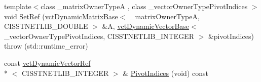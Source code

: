 \begin{DoxyCompactItemize}
{\footnotesize template$<$class \-\_\-matrix\-Owner\-Type\-A , class \-\_\-vector\-Owner\-Type\-Pivot\-Indices $>$ }\\void \hyperlink{classnmr_l_u_dynamic_data_ae456c133f5faeb23177a4a50fbb20eb7}{Set\-Ref} (\hyperlink{classvct_dynamic_matrix_base}{vct\-Dynamic\-Matrix\-Base}$<$ \-\_\-matrix\-Owner\-Type\-A, C\-I\-S\-S\-T\-N\-E\-T\-L\-I\-B\-\_\-\-D\-O\-U\-B\-L\-E $>$ \&A, \hyperlink{classvct_dynamic_vector_base}{vct\-Dynamic\-Vector\-Base}$<$ \-\_\-vector\-Owner\-Type\-Pivot\-Indices, C\-I\-S\-S\-T\-N\-E\-T\-L\-I\-B\-\_\-\-I\-N\-T\-E\-G\-E\-R $>$ \&pivot\-Indices)  throw (std\-::runtime\-\_\-error)
\item 
const \hyperlink{classvct_dynamic_vector_ref}{vct\-Dynamic\-Vector\-Ref}\\*
$<$ C\-I\-S\-S\-T\-N\-E\-T\-L\-I\-B\-\_\-\-I\-N\-T\-E\-G\-E\-R $>$ \& \hyperlink{classnmr_l_u_dynamic_data_a97a173a0a54cfc4954dbef98fafda4f1}{Pivot\-Indices} (void) const 
\end{DoxyCompactItemize}
